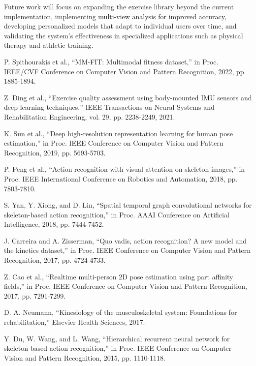 \documentclass[11pt]{article}
\begin{document}
Future work will focus on expanding the exercise library beyond the current implementation, implementing multi-view analysis for improved accuracy, developing personalized models that adapt to individual users over time, and validating the system's effectiveness in specialized applications such as physical therapy and athletic training.

\begin{thebibliography}{16}
 P. Spithourakis et al., ``MM-FIT: Multimodal fitness dataset,'' in Proc. IEEE/CVF Conference on Computer Vision and Pattern Recognition, 2022, pp. 1885-1894.

 Z. Ding et al., ``Exercise quality assessment using body-mounted IMU sensors and deep learning techniques,'' IEEE Transactions on Neural Systems and Rehabilitation Engineering, vol. 29, pp. 2238-2249, 2021.

 K. Sun et al., ``Deep high-resolution representation learning for human pose estimation,'' in Proc. IEEE Conference on Computer Vision and Pattern Recognition, 2019, pp. 5693-5703.

 P. Peng et al., ``Action recognition with visual attention on skeleton images,'' in Proc. IEEE International Conference on Robotics and Automation, 2018, pp. 7803-7810.

 S. Yan, Y. Xiong, and D. Lin, ``Spatial temporal graph convolutional networks for skeleton-based action recognition,'' in Proc. AAAI Conference on Artificial Intelligence, 2018, pp. 7444-7452.

 J. Carreira and A. Zisserman, ``Quo vadis, action recognition? A new model and the kinetics dataset,'' in Proc. IEEE Conference on Computer Vision and Pattern Recognition, 2017, pp. 4724-4733.

 Z. Cao et al., ``Realtime multi-person 2D pose estimation using part affinity fields,'' in Proc. IEEE Conference on Computer Vision and Pattern Recognition, 2017, pp. 7291-7299.

 D. A. Neumann, ``Kinesiology of the musculoskeletal system: Foundations for rehabilitation,'' Elsevier Health Sciences, 2017.

 Y. Du, W. Wang, and L. Wang, ``Hierarchical recurrent neural network for skeleton based action recognition,'' in Proc. IEEE Conference on Computer Vision and Pattern Recognition, 2015, pp. 1110-1118.


\end{thebibliography}
\end{document}
